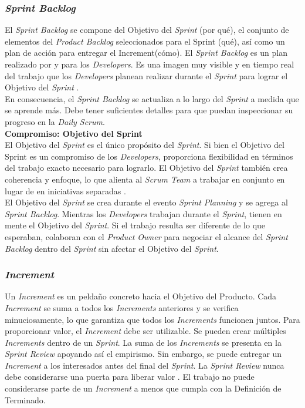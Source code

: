 \begin{spacing}{1.5}
		\subsubsection{\textit{Sprint Backlog}}
			El \textit{Sprint Backlog} se compone del Objetivo del \textit{Sprint} (por qué), el conjunto de elementos del \textit{Product Backlog} seleccionados para el Sprint (qué), así como un plan de acción para entregar el Increment(cómo).
			El \textit{Sprint Backlog} es un plan realizado por y para los \textit{Developers}. Es una imagen muy visible y en tiempo real del trabajo que los \textit{Developers} planean realizar durante el \textit{Sprint} para lograr el Objetivo del \textit{Sprint} \cite{chap2_scrum}.\\
			En consecuencia, el \textit{Sprint Backlog} se actualiza a lo largo del \textit{Sprint} a medida que se aprende más. Debe tener suficientes detalles para que puedan inspeccionar su progreso en la \textit{Daily Scrum}.\\
			
			\textbf{Compromiso: Objetivo del Sprint}\\
			El Objetivo del \textit{Sprint} es el único propósito del \textit{Sprint}. Si bien el Objetivo del Sprint es un compromiso de los \textit{Developers}, proporciona flexibilidad en términos del trabajo exacto necesario para lograrlo. El Objetivo del \textit{Sprint} también crea coherencia y enfoque, lo que alienta al \textit{Scrum Team} a trabajar en conjunto en lugar de en iniciativas separadas \cite{chap2_scrum}.\\
			El Objetivo del \textit{Sprint} se crea durante el evento \textit{Sprint Planning} y se agrega al \textit{Sprint Backlog}. Mientras los \textit{Developers} trabajan durante el \textit{Sprint}, tienen en mente el Objetivo del \textit{Sprint}. Si el trabajo resulta ser diferente de lo que esperaban, colaboran con el \textit{Product Owner} para negociar el alcance del \textit{Sprint Backlog} dentro del \textit{Sprint} sin afectar el Objetivo del \textit{Sprint}.
		\subsubsection{\textit{Increment}}
			Un \textit{Increment} es un peldaño concreto hacia el Objetivo del Producto. Cada \textit{Increment} se suma a todos los \textit{Increments} anteriores y se verifica minuciosamente, lo que garantiza que todos los \textit{Increments} funcionen juntos. Para proporcionar valor, el \textit{Increment} debe ser utilizable. Se pueden crear múltiples \textit{Increments} dentro de un \textit{Sprint}. La suma de los \textit{Increments} se presenta en la \textit{Sprint Review} apoyando así el empirismo. Sin embargo, se puede entregar un \textit{Increment} a los interesados antes del final del \textit{Sprint}. La \textit{Sprint Review} nunca debe considerarse una puerta para liberar	valor \cite{chap2_scrum}.
			El trabajo no puede considerarse parte de un \textit{Increment} a menos que cumpla con la Definición de
			Terminado.\\
			

\end{spacing}
